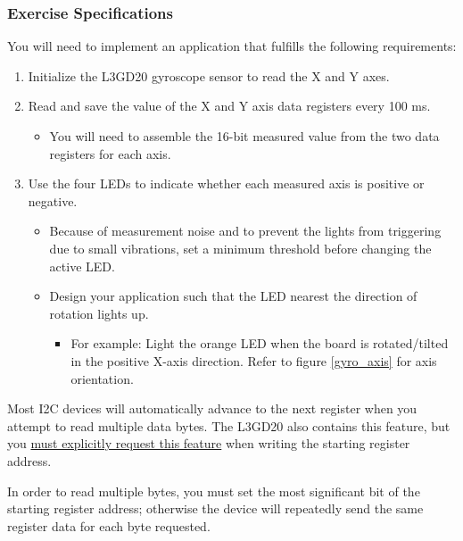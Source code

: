 \documentclass[openany,11pt,fleqn]{book} %
\begin{document}
\begin{exercise}
	\subsubsection{Exercise Specifications}
	You will need to implement an application that fulfills the following requirements:
	\begin{enumerate}
	    \item Initialize the L3GD20 gyroscope sensor to read the X and Y axes.
	    \item Read and save the value of the X and Y axis data registers every 100 ms.
	    \begin{itemize}
	        \item You will need to assemble the 16-bit measured value from the two data registers for each axis. 
	    \end{itemize}
	    \item Use the four LEDs to indicate whether each measured axis is positive or negative. 
	    \begin{itemize}
	        \item Because of measurement noise and to prevent the lights from triggering due to small vibrations, set a minimum threshold before changing the active LED.
	        \item Design your application such that the LED nearest the direction of rotation lights up.
	        \begin{itemize}
	            \item For example: Light the orange LED when the board is rotated/tilted in the positive X-axis direction. Refer to figure \ref{gyro_axis} for axis orientation. 
	        \end{itemize} 
	    \end{itemize}
	\end{enumerate}
\end{exercise}

\begin{warning}
    Most I2C devices will automatically advance to the next register when you attempt to read multiple data bytes. The L3GD20 also contains this feature, but you \underline{must explicitly request this feature} when writing the starting register address. 
    
    In order to read multiple bytes, you must set the most significant bit of the starting register address; otherwise the device will repeatedly send the same register data for each byte requested.
\end{warning}
\end{document}
